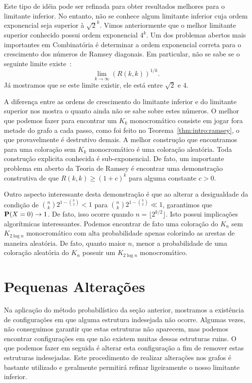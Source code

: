 Este tipo de idéia pode ser refinada para obter resultados melhores para o limitante inferior. No entanto, não se conhece algum limitante inferior cuja ordem exponencial seja superior à $\sqrt{2}^k$. Vimos anteriormente que o melhor limitante superior conhecido possui ordem exponencial $4^k$. Um dos problemas abertos mais importantes em Combinatória é determinar a ordem exponencial correta para o crescimento dos números de Ramsey diagonais. Em particular, não se sabe se o seguinte limite existe~\cite{chung1983survey}:
\[ \lim_{k \to \infty} \left(R(k,k)  \right)^{1/k}. \]
Já mostramos que se este limite existir, ele está entre $\sqrt{2}$ e $4$.

A diferença entre as ordens de crescimento do limitante inferior e do limitante superior nos mostra o quanto ainda não se sabe sobre estes números. O melhor que podemos fazer para encontrar um $K_k$ monocromático consiste em jogar fora metade do grafo a cada passo, como foi feito no Teorema~\ref{thm:intro:ramsey}, o que provavelmente é destrutivo demais. A melhor construção que encontramos para uma coloração sem $K_k$ monocromático é uma coloração aleatória. Toda construção explicita conhecida é sub-exponencial. De fato, um importante problema em aberto da Teoria de Ramsey é encontrar uma demonstração construtiva de que $R(k,k) \geq (1+c)^k$ para alguma constante $c > 0$.

Outro aspecto interessante desta demonstração é que ao alterar a desigualdade da condição de $\binom{n}{k} 2^{1 - \binom{k}{2}} < 1$ para $\binom{n}{k} 2^{1 - \binom{k}{2}} \ll 1$, garantimos que $\operatorname{\mathbf{P}}(X = 0) \to 1$. De fato, isso ocorre quando $n = \lfloor 2^{k/2} \rfloor$. Isto possui implicações algorítmicas interessantes. Podemos encontrar de fato uma coloração do $K_n$ sem $K_{2\log n}$ monocromático com alta probabilidade apenas colorindo as arestas de maneira aleatória. De fato, quanto maior $n$, menor a probabilidade de uma coloração aleatória do $K_n$ possuir um $K_{2\log n}$ monocromático.


\section{Pequenas Alterações}

Na aplicação do método probabilístico da seção anterior, mostramos a existência de configurações em que alguma estrutura indesejada não ocorre. Algumas vezes, não conseguimos garantir que estas estruturas não aparecem, mas podemos encontrar configurações em que não existem muitas dessas estruturas ruins. O que podemos fazer em seguida é alterar esta configuração a fim de remover estas estruturas indesejadas. Este procedimento de realizar alterações nos grafos é bastante utilizado e geralmente permitirá refinar ligeiramente o nosso limitante inferior.

